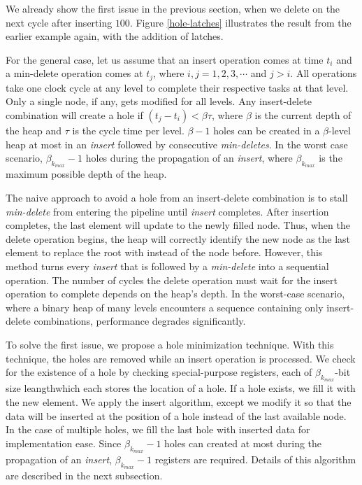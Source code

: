 We already show the first issue in the previous section, when we delete on the next cycle after inserting $100$. 
Figure \ref{hole-latches} illustrates the result from the earlier example again, with the addition of latches.

For the general case, let us assume that an insert operation comes at time $t_i$ and a min-delete operation comes at $t_j$, where $i, j = 1,2,3, \cdots$ and $j>i$.
All operations take one clock cycle at any level to complete their respective tasks at that level.
Only a single node, if any, gets modified for all levels.
Any insert-delete combination will create a hole if $(t_j - t_i) < \beta\tau$, where $\beta$ is the current depth of the heap and $\tau$ is the cycle time per level. 
$\beta - 1$ holes can be created in a $\beta$-level heap at most in an {\it insert} followed by consecutive {\it min-deletes}. In the worst case scenario, $\beta_{k_{max}} - 1$ holes during the propagation of an {\it insert}, where $\beta_{k_{max}}$ is the maximum possible depth of the heap. 

The naive approach to avoid a hole from an insert-delete combination is to stall {\it min-delete} from entering the pipeline until {\it insert} completes.
After insertion completes, the last element will update to the newly filled node.
Thus, when the delete operation begins, the heap will correctly identify the new node as the last element to replace the root with instead of the node before.
However, this method turns every {\it insert} that is followed by a {\it min-delete} into a sequential operation.
The number of cycles the delete operation must wait for the insert operation to complete depends on the heap's depth.
In the worst-case scenario, where a binary heap of many levels encounters a sequence containing only insert-delete combinations, performance degrades significantly.

To solve the first issue, we propose a hole minimization technique.
With this technique, the holes are removed while an insert operation is processed.
We check for the existence of a hole by checking special-purpose registers, each of $\beta_{k_{max}}$-bit size leangthwhich each stores the location of a hole. 
If a hole exists, we fill it with the new element. 
We apply the insert algorithm, except we modify it so that the data will be inserted at the position of a hole instead of the last available node.
In the case of multiple holes, we fill the last hole with inserted data for implementation ease.
Since $\beta_{k_{max}} - 1$ holes can created at most during the propagation of an {\it insert}, $\beta_{k_{max}} - 1$ registers are required.
Details of this algorithm are described in the next subsection.

